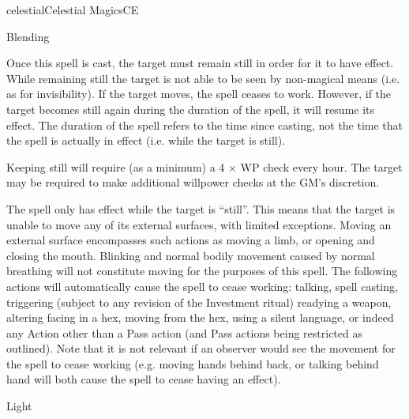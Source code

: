 \begin{College}[1.3]{celestial}{Celestial Magics}{CE}
\begin{spell}[G-1]{Blending}
\begin{effects}
Once this spell is cast, the target must remain still in order for it
to have effect.  While remaining still the target is not able to be
seen by non-magical means (i.e.  as for invisibility).  If the target
moves, the spell ceases to work. However, if the target becomes still
again during the duration of the spell, it will resume its effect.
The duration of the spell refers to the time since casting, not the
time that the spell is actually in effect (i.e.  while the target is
still).

Keeping still will require (as a minimum) a 4 × WP check every hour.
The target may be required to make additional willpower checks at the
GM’s discretion.

The spell only has effect while the target is “still”.  This means
that the target is unable to move any of its external surfaces, with
limited exceptions. Moving an external surface encompasses such
actions as moving a limb, or opening and closing the mouth.  Blinking
and normal bodily movement caused by normal breathing will not
constitute moving for the purposes of this spell.  The following
actions will automatically cause the spell to cease working: talking,
spell casting, triggering (subject to any revision of the Investment
ritual) readying a weapon, altering facing in a hex, moving from the
hex, using a silent language, or indeed any Action other than a Pass
action (and Pass actions being restricted as outlined).  Note that it
is not relevant if an observer would see the movement for the spell to
cease working (e.g.  moving hands behind back, or talking behind hand
will both cause the spell to cease having an effect).
\end{effects}
\end{spell}

\begin{spell}[G-2]{Light}


\end{spell}
\end{College}
